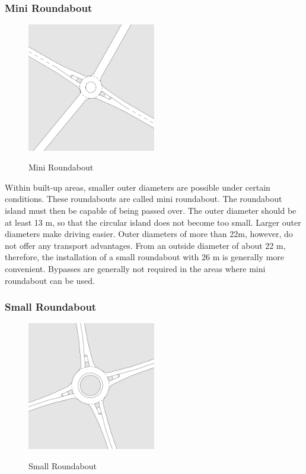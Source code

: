\subsubsection{Mini Roundabout}

\begin{figure}[!ht]
\caption{Mini Roundabout \cite{man06}}
\includegraphics[width=0.5\textwidth]{bilder/mini_roundabout.png} %
\label{roundabout_mini}
\end{figure}

Within built-up areas, smaller outer diameters are possible under certain conditions.
These roundabouts are called mini roundabout. The roundabout island must then be capable of being passed over.
The outer diameter should be at least 13 m, so that the circular island does not become too small.
Larger outer diameters make driving easier. Outer diameters of more than 22m, however, do not offer any transport advantages.
From an outside diameter of about 22 m, therefore, the installation of a small roundabout with 26 m is generally more convenient.
Bypasses are generally not required in the areas where mini roundabout can be used.


\subsubsection{Small Roundabout}

\begin{figure}[!ht]
\caption{Small Roundabout \cite{man06}}
\includegraphics[width=0.5\textwidth]{bilder/small_roundabout.png} %
\label{roundabout_small}
\end{figure}

